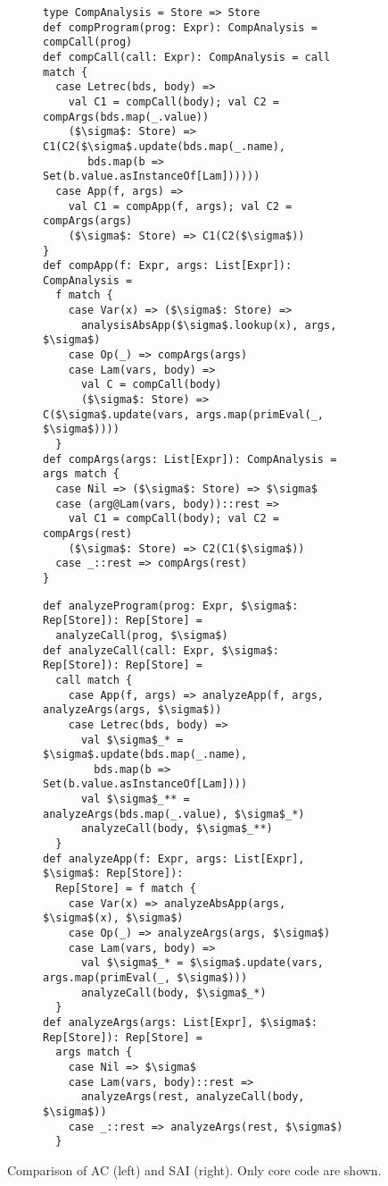 \begin{figure*}
  \centering
  \begin{subfigure}[h]{0.49\textwidth}
    \centering
    \begin{lstlisting}[style=extrasmall]
type CompAnalysis = Store => Store
def compProgram(prog: Expr): CompAnalysis = compCall(prog)
def compCall(call: Expr): CompAnalysis = call match {
  case Letrec(bds, body) =>
    val C1 = compCall(body); val C2 = compArgs(bds.map(_.value))
    ($\sigma$: Store) => C1(C2($\sigma$.update(bds.map(_.name), 
       bds.map(b => Set(b.value.asInstanceOf[Lam])))))
  case App(f, args) =>
    val C1 = compApp(f, args); val C2 = compArgs(args)
    ($\sigma$: Store) => C1(C2($\sigma$))
}
def compApp(f: Expr, args: List[Expr]): CompAnalysis = 
  f match {
    case Var(x) => ($\sigma$: Store) => 
      analysisAbsApp($\sigma$.lookup(x), args, $\sigma$)
    case Op(_) => compArgs(args)
    case Lam(vars, body) =>
      val C = compCall(body)
      ($\sigma$: Store) => C($\sigma$.update(vars, args.map(primEval(_, $\sigma$))))
  }
def compArgs(args: List[Expr]): CompAnalysis = args match {
  case Nil => ($\sigma$: Store) => $\sigma$
  case (arg@Lam(vars, body))::rest =>
    val C1 = compCall(body); val C2 = compArgs(rest)
    ($\sigma$: Store) => C2(C1($\sigma$))
  case _::rest => compArgs(rest)
}
  \end{lstlisting}
  \end{subfigure}
\hfill
  \begin{subfigure}[h]{0.49\textwidth}
    \centering
    \begin{lstlisting}[style=extrasmall]
def analyzeProgram(prog: Expr, $\sigma$: Rep[Store]): Rep[Store] = 
  analyzeCall(prog, $\sigma$)
def analyzeCall(call: Expr, $\sigma$: Rep[Store]): Rep[Store] = 
  call match {
    case App(f, args) => analyzeApp(f, args, analyzeArgs(args, $\sigma$))
    case Letrec(bds, body) =>
      val $\sigma$_* = $\sigma$.update(bds.map(_.name), 
        bds.map(b => Set(b.value.asInstanceOf[Lam])))
      val $\sigma$_** = analyzeArgs(bds.map(_.value), $\sigma$_*)
      analyzeCall(body, $\sigma$_**)
  }
def analyzeApp(f: Expr, args: List[Expr], $\sigma$: Rep[Store]): 
  Rep[Store] = f match {
    case Var(x) => analyzeAbsApp(args, $\sigma$(x), $\sigma$)
    case Op(_) => analyzeArgs(args, $\sigma$)
    case Lam(vars, body) =>
      val $\sigma$_* = $\sigma$.update(vars, args.map(primEval(_, $\sigma$)))
      analyzeCall(body, $\sigma$_*)
  }
def analyzeArgs(args: List[Expr], $\sigma$: Rep[Store]): Rep[Store] = 
  args match {
    case Nil => $\sigma$
    case Lam(vars, body)::rest => 
      analyzeArgs(rest, analyzeCall(body, $\sigma$))
    case _::rest => analyzeArgs(rest, $\sigma$)
  }
  \end{lstlisting}

  \end{subfigure}
  \caption{Comparison of AC (left) and SAI (right). Only core code are shown.}
  \label{compare_ac_sai}
\end{figure*}

